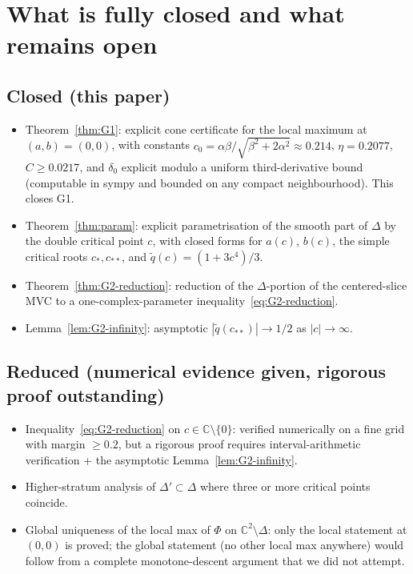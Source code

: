 \documentclass[11pt,a4paper]{article}
\begin{document}
\section{What is fully closed and what remains open}
\label{sec:open}

\subsection*{Closed (this paper)}

\begin{itemize}
\item Theorem~\ref{thm:G1}: explicit cone certificate for the local
maximum at $(a,b)=(0,0)$, with constants
$c_0 = \alpha\beta/\sqrt{\beta^2+2\alpha^2}\approx 0.214$,
$\eta=0.2077$, $C\ge 0.0217$, and $\delta_0$ explicit modulo a uniform
third-derivative bound (computable in sympy and bounded on any compact
neighbourhood). This closes G1.
\item Theorem~\ref{thm:param}: explicit parametrisation of the smooth
part of $\Delta$ by the double critical point $c$, with closed forms
for $a(c)$, $b(c)$, the simple critical roots $c_*,c_{**}$, and
$\widetilde q(c) = (1+3c^4)/3$.
\item Theorem~\ref{thm:G2-reduction}: reduction of the
$\Delta$-portion of the centered-slice MVC to a one-complex-parameter
inequality~\eqref{eq:G2-reduction}.
\item Lemma~\ref{lem:G2-infinity}: asymptotic
$|\widetilde q(c_{**})|\to 1/2$ as $|c|\to\infty$.
\end{itemize}

\subsection*{Reduced (numerical evidence given, rigorous proof outstanding)}

\begin{itemize}
\item Inequality~\eqref{eq:G2-reduction} on
  $c\in\mathbb{C}\setminus\{0\}$: verified numerically on a fine grid
  with margin $\ge 0.2$, but a rigorous proof requires interval-arithmetic
  verification + the asymptotic Lemma~\ref{lem:G2-infinity}.
\item Higher-stratum analysis of $\Delta'\subset\Delta$ where three or
  more critical points coincide.
\item Global uniqueness of the local max of $\Phi$ on
  $\mathbb{C}^2\setminus\Delta$: only the local statement at $(0,0)$
  is proved; the global statement (no other local max anywhere) would
  follow from a complete monotone-descent argument that we did not
  attempt.
\end{itemize}
\end{document}
